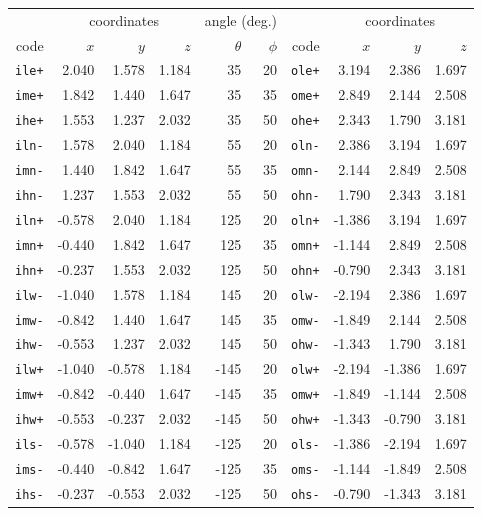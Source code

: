 \begin{tabular}{rrrrrrrrrr}
\toprule
&
\multicolumn{3}{c}{coordinates}&
\multicolumn{2}{c}{angle (deg.)}&&
\multicolumn{3}{c}{coordinates}\\
\cmidrule(lr){2-4}
\cmidrule(lr){5-6}
\cmidrule(l){8-10}
code&
$x$&
$y$&
$z$&
$\theta$&
$\phi$&
code&
$x$&
$y$&
$z$\\
\midrule
\verb|ile+| & 2.040 & 1.578 & 1.184 & 35 & 20 & \verb|ole+| & 3.194 & 2.386 & 1.697\\
\verb|ime+| & 1.842 & 1.440 & 1.647 & 35 & 35 & \verb|ome+| & 2.849 & 2.144 & 2.508\\
\verb|ihe+| & 1.553 & 1.237 & 2.032 & 35 & 50 & \verb|ohe+| & 2.343 & 1.790 & 3.181\\
\verb|iln-| & 1.578 & 2.040 & 1.184 & 55 & 20 & \verb|oln-| & 2.386 & 3.194 & 1.697\\
\verb|imn-| & 1.440 & 1.842 & 1.647 & 55 & 35 & \verb|omn-| & 2.144 & 2.849 & 2.508\\
\verb|ihn-| & 1.237 & 1.553 & 2.032 & 55 & 50 & \verb|ohn-| & 1.790 & 2.343 & 3.181\\
\verb|iln+| & -0.578 & 2.040 & 1.184 & 125 & 20 & \verb|oln+| & -1.386 & 3.194 & 1.697\\
\verb|imn+| & -0.440 & 1.842 & 1.647 & 125 & 35 & \verb|omn+| & -1.144 & 2.849 & 2.508\\
\verb|ihn+| & -0.237 & 1.553 & 2.032 & 125 & 50 & \verb|ohn+| & -0.790 & 2.343 & 3.181\\
\verb|ilw-| & -1.040 & 1.578 & 1.184 & 145 & 20 & \verb|olw-| & -2.194 & 2.386 & 1.697\\
\verb|imw-| & -0.842 & 1.440 & 1.647 & 145 & 35 & \verb|omw-| & -1.849 & 2.144 & 2.508\\
\verb|ihw-| & -0.553 & 1.237 & 2.032 & 145 & 50 & \verb|ohw-| & -1.343 & 1.790 & 3.181\\
\verb|ilw+| & -1.040 & -0.578 & 1.184 & -145 & 20 & \verb|olw+| & -2.194 & -1.386 & 1.697\\
\verb|imw+| & -0.842 & -0.440 & 1.647 & -145 & 35 & \verb|omw+| & -1.849 & -1.144 & 2.508\\
\verb|ihw+| & -0.553 & -0.237 & 2.032 & -145 & 50 & \verb|ohw+| & -1.343 & -0.790 & 3.181\\
\verb|ils-| & -0.578 & -1.040 & 1.184 & -125 & 20 & \verb|ols-| & -1.386 & -2.194 & 1.697\\
\verb|ims-| & -0.440 & -0.842 & 1.647 & -125 & 35 & \verb|oms-| & -1.144 & -1.849 & 2.508\\
\verb|ihs-| & -0.237 & -0.553 & 2.032 & -125 & 50 & \verb|ohs-| & -0.790 & -1.343 & 3.181\\

\end{tabular}
